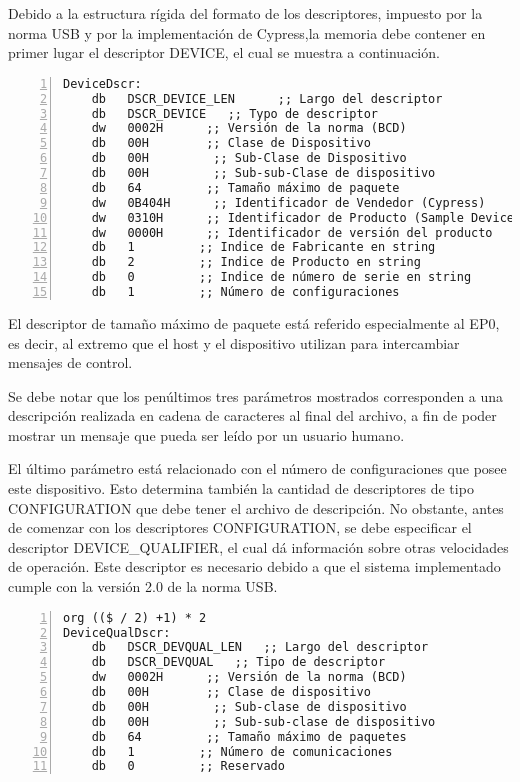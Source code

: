 	Debido a la estructura rígida del formato de los descriptores, impuesto por la norma USB y por la implementación de Cypress,la memoria debe contener en primer lugar el descriptor DEVICE, el cual se muestra a continuación.
	
	\begin{lstlisting}[language={[x86masm]Assembler},backgroundcolor=\color{gray!30},numbers=left]
DeviceDscr:
	db   DSCR_DEVICE_LEN      ;; Largo del descriptor
	db   DSCR_DEVICE   ;; Typo de descriptor
	dw   0002H      ;; Versión de la norma (BCD)
	db   00H        ;; Clase de Dispositivo
	db   00H         ;; Sub-Clase de Dispositivo
	db   00H         ;; Sub-sub-Clase de dispositivo
	db   64         ;; Tamaño máximo de paquete
	dw   0B404H      ;; Identificador de Vendedor (Cypress) 
	dw   0310H      ;; Identificador de Producto (Sample Device)
	dw   0000H      ;; Identificador de versión del producto
	db   1         ;; Indice de Fabricante en string
	db   2         ;; Indice de Producto en string
	db   0         ;; Indice de número de serie en string
	db   1         ;; Número de configuraciones
	\end{lstlisting}
	
	El descriptor de tamaño máximo de paquete está referido especialmente al EP0, es decir, al extremo que el host y el dispositivo utilizan para intercambiar mensajes de control.
	
	Se debe notar que los penúltimos tres parámetros mostrados corresponden a una descripción realizada en cadena de caracteres al final del archivo, a fin de poder mostrar un mensaje que pueda ser leído por un usuario humano.
	
	El último parámetro está relacionado con el número de configuraciones que posee este dispositivo. Esto determina también la cantidad de descriptores de tipo CONFIGURATION que debe tener el archivo de descripción. No obstante, antes de comenzar con los descriptores CONFIGURATION, se debe especificar el descriptor DEVICE\_QUALIFIER, el cual dá información sobre otras velocidades de operación. Este descriptor es necesario debido a que el sistema implementado cumple con la versión 2.0 de la norma USB.
	
	\begin{lstlisting}[language={[x86masm]Assembler},backgroundcolor=\color{gray!30},numbers=left]
org (($ / 2) +1) * 2
DeviceQualDscr:
	db   DSCR_DEVQUAL_LEN   ;; Largo del descriptor
	db   DSCR_DEVQUAL   ;; Tipo de descriptor
	dw   0002H      ;; Versión de la norma (BCD)
	db   00H        ;; Clase de dispositivo
	db   00H         ;; Sub-clase de dispositivo
	db   00H         ;; Sub-sub-clase de dispositivo
	db   64         ;; Tamaño máximo de paquetes
	db   1         ;; Número de comunicaciones
	db   0         ;; Reservado
	\end{lstlisting}
	
